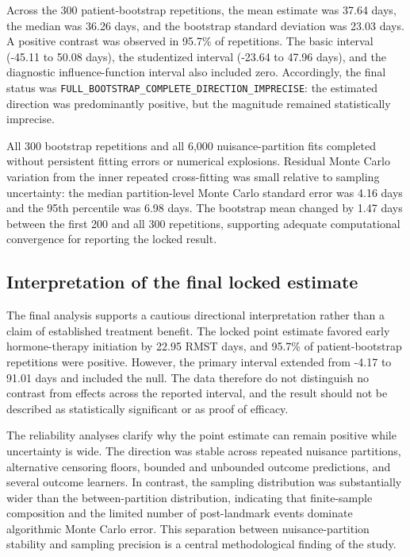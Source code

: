 Across the 300 patient-bootstrap repetitions, the mean estimate was 37.64 days, the median was 36.26 days, and the bootstrap standard deviation was 23.03 days. A positive contrast was observed in 95.7\% of repetitions. The basic interval (-45.11 to 50.08 days), the studentized interval (-23.64 to 47.96 days), and the diagnostic influence-function interval also included zero. Accordingly, the final status was \texttt{FULL_BOOTSTRAP_COMPLETE_DIRECTION_IMPRECISE}: the estimated direction was predominantly positive, but the magnitude remained statistically imprecise.

All 300 bootstrap repetitions and all 6,000 nuisance-partition fits completed without persistent fitting errors or numerical explosions. Residual Monte Carlo variation from the inner repeated cross-fitting was small relative to sampling uncertainty: the median partition-level Monte Carlo standard error was 4.16 days and the 95th percentile was 6.98 days. The bootstrap mean changed by 1.47 days between the first 200 and all 300 repetitions, supporting adequate computational convergence for reporting the locked result.

\subsection{Interpretation of the final locked estimate}

The final analysis supports a cautious directional interpretation rather than a claim of established treatment benefit. The locked point estimate favored early hormone-therapy initiation by 22.95 RMST days, and 95.7\% of patient-bootstrap repetitions were positive. However, the primary interval extended from -4.17 to 91.01 days and included the null. The data therefore do not distinguish no contrast from effects across the reported interval, and the result should not be described as statistically significant or as proof of efficacy.

The reliability analyses clarify why the point estimate can remain positive while uncertainty is wide. The direction was stable across repeated nuisance partitions, alternative censoring floors, bounded and unbounded outcome predictions, and several outcome learners. In contrast, the sampling distribution was substantially wider than the between-partition distribution, indicating that finite-sample composition and the limited number of post-landmark events dominate algorithmic Monte Carlo error. This separation between nuisance-partition stability and sampling precision is a central methodological finding of the study.

